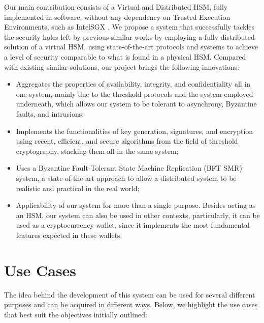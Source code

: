 Our main contribution consists of a Virtual and Distributed HSM, fully implemented in software, without any dependency on Trusted Execution Environments, such as IntelSGX \cite{intelsgx}. We propose a system that successfully tackles the security holes left by previous similar works by employing a fully distributed solution of a virtual HSM, using state-of-the-art protocols and systems to achieve a level of security comparable to what is found in a physical HSM. Compared with existing similar solutions, our project brings the following innovations:
\begin{itemize}
    \item Aggregates the properties of availability, integrity, and confidentiality all in one system, mainly due to the threshold protocols and the system employed underneath, which allows our system to be tolerant to asynchrony, Byzantine faults, and intrusions;
    \item Implements the functionalities of key generation, signatures, and encryption using recent, efficient, and secure algorithms from the field of threshold cryptography, stacking them all in the same system;
    \item Uses a Byzantine Fault-Tolerant State Machine Replication (BFT SMR) system, a state-of-the-art approach to allow a distributed system to be realistic and practical in the real world;
    \item Applicability of our system for more than a single purpose. Besides acting as an HSM, our system can also be used in other contexts, particularly, it can be used as a cryptocurrency wallet, since it implements the most fundamental features expected in these wallets.
\end{itemize}

\section{Use Cases}

The idea behind the development of this system can be used for several different purposes and can be acquired in different ways. Below, we highlight the use cases that best suit the objectives initially outlined:  

